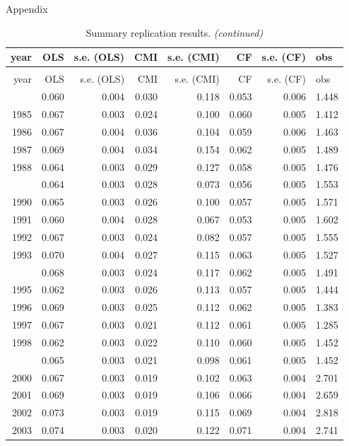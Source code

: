 \documentclass[10pt,ignorenonframetext,]{beamer}
\begin{document}
\begin{frame}[allowframebreaks]{Appendix}
\begin{longtable}[t]{rrrrrrrl}
\caption{\label{tab:unnamed-chunk-4}Summary replication results.}\\
\toprule
year & OLS & s.e. (OLS) & CMI & s.e. (CMI) & CF & s.e. (CF) & obs\\
\midrule
\endfirsthead
\caption[]{Summary replication results. \textit{(continued)}}\\
\toprule
year & OLS & s.e. (OLS) & CMI & s.e. (CMI) & CF & s.e. (CF) & obs\\
\midrule
\endhead
\
\endfoot
\bottomrule
\endlastfoot
1984 & 0.060 & 0.004 & 0.030 & 0.118 & 0.053 & 0.006 & 1.448\\
1985 & 0.067 & 0.003 & 0.024 & 0.100 & 0.060 & 0.005 & 1.412\\
1986 & 0.067 & 0.004 & 0.036 & 0.104 & 0.059 & 0.006 & 1.463\\
1987 & 0.069 & 0.004 & 0.034 & 0.154 & 0.062 & 0.005 & 1.489\\
1988 & 0.064 & 0.003 & 0.029 & 0.127 & 0.058 & 0.005 & 1.476\\
\addlinespace
1989 & 0.064 & 0.003 & 0.028 & 0.073 & 0.056 & 0.005 & 1.553\\
1990 & 0.065 & 0.003 & 0.026 & 0.100 & 0.057 & 0.005 & 1.571\\
1991 & 0.060 & 0.004 & 0.028 & 0.067 & 0.053 & 0.005 & 1.602\\
1992 & 0.067 & 0.003 & 0.024 & 0.082 & 0.057 & 0.005 & 1.555\\
1993 & 0.070 & 0.004 & 0.027 & 0.115 & 0.063 & 0.005 & 1.527\\
\addlinespace
1994 & 0.068 & 0.003 & 0.024 & 0.117 & 0.062 & 0.005 & 1.491\\
1995 & 0.062 & 0.003 & 0.026 & 0.113 & 0.057 & 0.005 & 1.444\\
1996 & 0.069 & 0.003 & 0.025 & 0.112 & 0.062 & 0.005 & 1.383\\
1997 & 0.067 & 0.003 & 0.021 & 0.112 & 0.061 & 0.005 & 1.285\\
1998 & 0.062 & 0.003 & 0.022 & 0.110 & 0.060 & 0.005 & 1.452\\
\addlinespace
1999 & 0.065 & 0.003 & 0.021 & 0.098 & 0.061 & 0.005 & 1.452\\
2000 & 0.067 & 0.003 & 0.019 & 0.102 & 0.063 & 0.004 & 2.701\\
2001 & 0.069 & 0.003 & 0.019 & 0.106 & 0.066 & 0.004 & 2.659\\
2002 & 0.073 & 0.003 & 0.019 & 0.115 & 0.069 & 0.004 & 2.818\\
2003 & 0.074 & 0.003 & 0.020 & 0.122 & 0.071 & 0.004 & 2.741\\

\end{longtable}
\end{frame}
\end{document}
